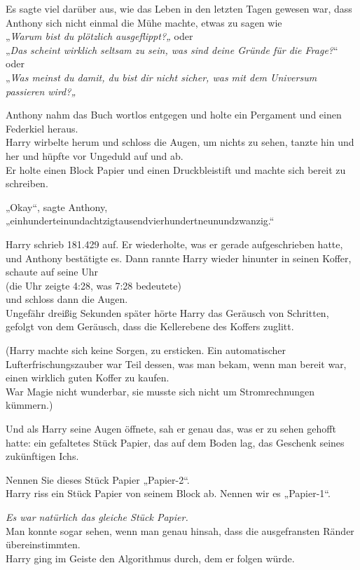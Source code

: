 {Es sagte viel darüber aus, wie das Leben in den letzten Tagen gewesen war, dass Anthony sich nicht einmal die Mühe machte, etwas zu sagen wie\\ „\emph{Warum bist du plötzlich ausgeflippt?„} oder\\ „\emph{Das scheint wirklich seltsam zu sein, was sind deine Gründe für die Frage?}“ oder\\ „\emph{Was meinst du damit, du bist dir nicht sicher, was mit dem Universum passieren wird?„}

Anthony nahm das Buch wortlos entgegen und holte ein Pergament und einen Federkiel heraus.\\ Harry wirbelte herum und schloss die Augen, um nichts zu sehen, tanzte hin und her und hüpfte vor Ungeduld auf und ab.\\ Er holte einen Block Papier und einen Druckbleistift und machte sich bereit zu schreiben.

„Okay“, sagte Anthony, „einhunderteinundachtzigtausendvierhundertneunundzwanzig.“

Harry schrieb 181.429 auf. Er wiederholte, was er gerade aufgeschrieben hatte, und Anthony bestätigte es. Dann rannte Harry wieder hinunter in seinen Koffer, schaute auf seine Uhr\\ (die Uhr zeigte 4:28, was 7:28 bedeutete)\\ und schloss dann die Augen.\\ Ungefähr dreißig Sekunden später hörte Harry das Geräusch von Schritten, gefolgt von dem Geräusch, dass die Kellerebene des Koffers zuglitt.

(Harry machte sich keine Sorgen, zu ersticken. Ein automatischer Lufterfrischungszauber war Teil dessen, was man bekam, wenn man bereit war, einen wirklich guten Koffer zu kaufen.\\ War Magie nicht wunderbar, sie musste sich nicht um Stromrechnungen kümmern.)

Und als Harry seine Augen öffnete, sah er genau das, was er zu sehen gehofft hatte: ein gefaltetes Stück Papier, das auf dem Boden lag, das Geschenk seines zukünftigen Ichs.

Nennen Sie dieses Stück Papier „Papier-2“.\\ Harry riss ein Stück Papier von seinem Block ab. Nennen wir es „Papier-1“.

\emph{Es war natürlich das gleiche Stück Papier.}\\ Man konnte sogar sehen, wenn man genau hinsah, dass die ausgefransten Ränder übereinstimmten.\\ Harry ging im Geiste den Algorithmus durch, dem er folgen würde.

}
